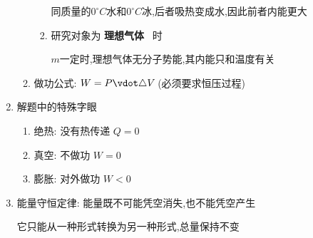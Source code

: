 \documentclass{article}
\begin{document}
\begin{enumerate}[label = \arabic*]
\begin{enumerate}[label = (\arabic*)]
\begin{enumerate}[label = (\alph*)]
\begin{minipage}{0.8\textwidth}
                                  同质量的$0^{\circ}C$水和$0^{\circ}C$冰,后者吸热变成水,因此前者内能更大
                              \end{minipage}
                        \item 研究对象为 \textbf{理想气体} \, 时

                              $m$一定时,理想气体无分子势能,其内能只和温度有关
                    \end{enumerate}
              \item 做功公式: $W = P \vdot \triangle V \, $(必须要求恒压过程)
          \end{enumerate}
    \item 解题中的特殊字眼
          \begin{enumerate}[label = (\arabic*)]
              \item 绝热: 没有热传递 $Q = 0$
              \item 真空: 不做功 $W = 0$
              \item 膨胀: 对外做功 $W < 0$
          \end{enumerate}

    \item 能量守恒定律: 能量既不可能凭空消失,也不能凭空产生

          \hspace{6.7em}它只能从一种形式转换为另一种形式,总量保持不变
\end{enumerate}

\vspace{2em}
\end{document}
